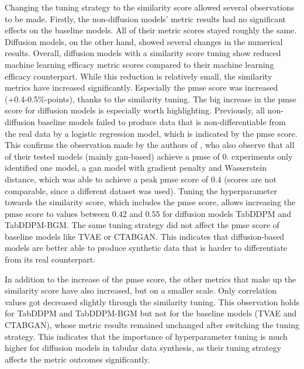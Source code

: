 Changing the tuning strategy to the similarity score allowed several observations to be made.
Firstly, the non-diffusion models' metric results had no significant effects on the baseline models.
All of their metric scores stayed roughly the same.
Diffusion models, on the other hand, showed several changes in the numerical results.
Overall, diffusion models with a similarity score tuning show reduced machine learning efficacy metric scores compared to their machine learning efficacy counterpart.
While this reduction is relatively small, the similarity metrics have increased significantly.
Especially the \gls{pmse} score was increased (+0.4-0.5\%-points), thanks to the similarity tuning.
The big increase in the \gls{pmse} score for diffusion models is especially worth highlighting.
Previously, all non-diffusion baseline models failed to produce data that is non-differentiable from the real data by a logistic regression model, which is indicated by the \gls{pmse} score.
This confirms the observation made by the authors of \cite{chundawat2022UniversalMetricRobust}, who also observe that all of their tested models (mainly \gls{gan}-based) achieve a \gls{pmse} of 0.
\cite{chundawat2022UniversalMetricRobust} experiments only identified one model, a \gls{gan} model with gradient penalty and Wasserstein distance, which was able to achieve a peak \gls{pmse} score of 0.4 (scores are not comparable, since a different dataset was used).
Tuning the hyperparameter towards the similarity score, which includes the \gls{pmse} score, allows increasing the \gls{pmse} score to values between $0.42$ and $0.55$ for diffusion models TabDDPM and TabDDPM-BGM.
The same tuning strategy did not affect the \gls{pmse} score of baseline models like TVAE or CTABGAN. 
This indicates that diffusion-based models are better able to produce synthetic data that is harder to differentiate from its real counterpart.

In addition to the increase of the \gls{pmse} score, the other metrics that make up the similarity score have also increased, but on a smaller scale.
Only correlation values got decreased slightly through the similarity tuning.
This observation holds for TabDDPM and TabDDPM-BGM but not for the baseline models (TVAE and CTABGAN), whose metric results remained unchanged after switching the tuning strategy.
This indicates that the importance of hyperparameter tuning is much higher for diffusion models in tabular data synthesis, as their tuning strategy affects the metric outcomes significantly.

